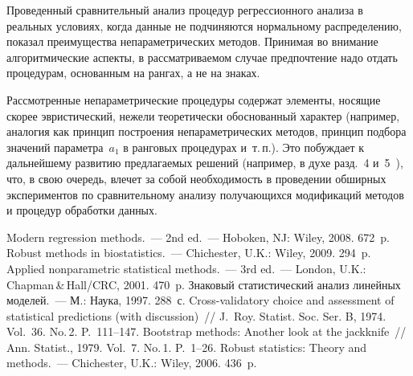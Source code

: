 \begin{multicols}{2}
     Проведенный сравнительный анализ процедур регрессионного анализа в
реальных условиях, когда данные не подчиняются нормальному
распределению, показал преимущества непараметрических методов. Принимая
во внимание алгоритмические аспекты, в рассматриваемом случае
предпочтение надо отдать процедурам, основанным на рангах, а не на знаках.

     Рассмотренные непараметрические процедуры содержат элементы,
носящие скорее эвристический, нежели теоретически обоснованный характер
(например, аналогия как принцип построения непараметрических методов,
принцип подбора значений параметра~$a_1$ в ранговых процедурах и~т.\,п.).
Это побуждает к дальнейшему развитию предлагаемых решений (например, в
духе разд.~4 и~5~\cite{8-kri}), что, в свою очередь, влечет за собой
необходимость в проведении обширных экспериментов по сравнительному
анализу получающихся модификаций методов и процедур обработки данных.

{\small\frenchspacing
 {%
 \begin{thebibliography}{9}
 Modern regression methods.~--- 2nd ed.~--- Hoboken, NJ: Wiley,
2008. 672~p.
 Robust methods in
biostatistics.~--- Chichester, U.K.: Wiley, 2009. 294~p.
 Applied nonparametric statistical methods.~---  3rd
ed.~--- London, U.K.: Chapman\,\&\,Hall/CRC, 2001. 470~p.
 Знаковый статистический
анализ линейных моделей.~--- М.: Наука, 1997. 288~с.
 Cross-validatory choice and assessment of statistical predictions (with
discussion)~// J.~Roy. Statist. Soc. Ser. B, 1974. Vol.~36. No.\,2. P.~111--147.
 Bootstrap methods: Another look at the jackknife~// Ann. Statist.,
1979. Vol.~7. No.\,1. P.~1--26.
 Robust statistics: Theory and
methods.~--- Chichester, U.K.: Wiley, 2006. 436~p.

\end{thebibliography}
} }

\end{multicols}

